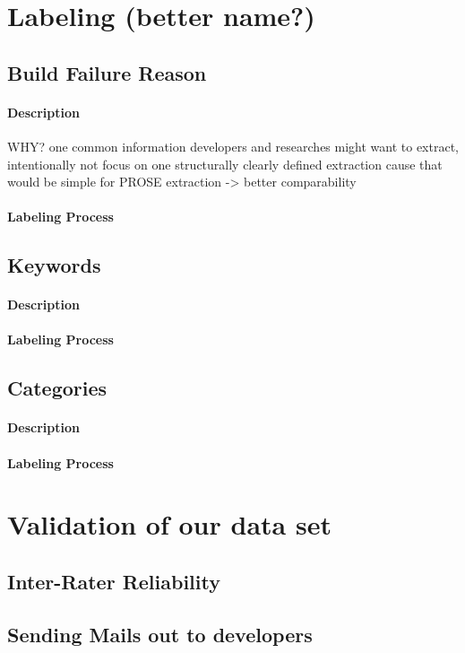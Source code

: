 \documentclass[\myrootdir/main.tex]{subfiles}
\begin{document}
\section{Labeling (better name?)}
  \subsection{Build Failure Reason}

    \paragraph{Description}
    WHY? one common information developers and researches might want to extract, intentionally not focus on one structurally clearly defined extraction   cause that would be simple for PROSE extraction -> better comparability
    \paragraph{Labeling Process}

  \subsection{Keywords}

    \paragraph{Description}

    \paragraph{Labeling Process}

  \subsection{Categories}

    \paragraph{Description}

    \paragraph{Labeling Process}

\section{Validation of our data set}

\subsection{Inter-Rater Reliability}

\subsection{Sending Mails out to developers}
\end{document}
